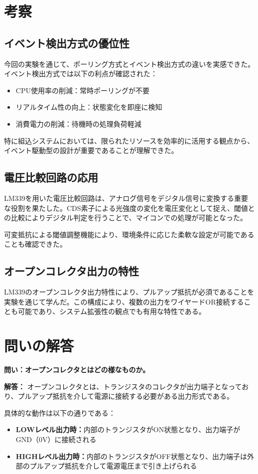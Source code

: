 \documentclass[a4paper,11pt,dvipdfmx]{jsarticle}
\begin{document}
\section{考察}
\subsection{イベント検出方式の優位性}
今回の実験を通じて、ポーリング方式とイベント検出方式の違いを実感できた。イベント検出方式では以下の利点が確認された：

\begin{itemize}
\item CPU使用率の削減：常時ポーリングが不要
\item リアルタイム性の向上：状態変化を即座に検知
\item 消費電力の削減：待機時の処理負荷軽減
\end{itemize}

特に組込システムにおいては、限られたリソースを効率的に活用する観点から、イベント駆動型の設計が重要であることが理解できた。

\subsection{電圧比較回路の応用}
LM339を用いた電圧比較回路は、アナログ信号をデジタル信号に変換する重要な役割を果たした。CDS素子による光強度の変化を電圧変化として捉え、閾値との比較によりデジタル判定を行うことで、マイコンでの処理が可能となった。

可変抵抗による閾値調整機能により、環境条件に応じた柔軟な設定が可能であることも確認できた。

\subsection{オープンコレクタ出力の特性}
LM339のオープンコレクタ出力特性により、プルアップ抵抗が必須であることを実験を通じて学んだ。この構成により、複数の出力をワイヤードOR接続することも可能であり、システム拡張性の観点でも有用な特性である。

\section{問いの解答}
\textbf{問い：オープンコレクタとはどの様なものか。}

\textbf{解答：}
オープンコレクタとは、トランジスタのコレクタが出力端子となっており、プルアップ抵抗を介して電源に接続する必要がある出力形式である。

具体的な動作は以下の通りである：
\begin{itemize}
\item \textbf{LOWレベル出力時：}内部のトランジスタがON状態となり、出力端子がGND（0V）に接続される
\item \textbf{HIGHレベル出力時：}内部のトランジスタがOFF状態となり、出力端子は外部のプルアップ抵抗を介して電源電圧まで引き上げられる
\end{itemize}
\end{document}
